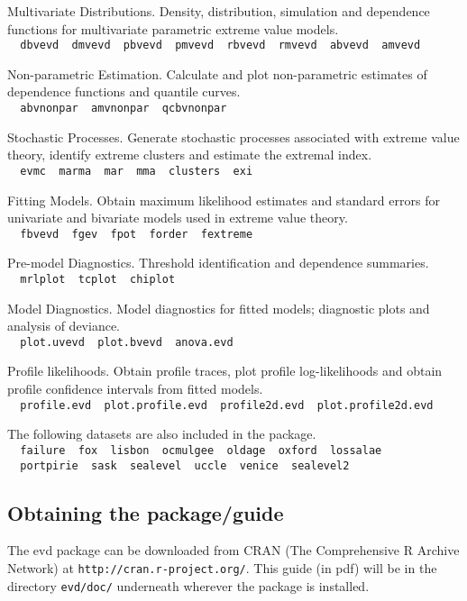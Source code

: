 \documentclass[11pt,a4paper]{article}
\begin{document}
Multivariate Distributions. Density, distribution, simulation and dependence functions for multivariate parametric extreme value models.\\
\verb+  dbvevd  dmvevd  pbvevd  pmvevd  rbvevd  rmvevd  abvevd  amvevd+

Non-parametric Estimation. Calculate and plot non-parametric estimates of dependence functions and quantile curves.\\  
\verb+  abvnonpar  amvnonpar  qcbvnonpar+

Stochastic Processes. Generate stochastic processes associated with extreme value theory, identify extreme clusters and estimate the extremal index.\\
\verb+  evmc  marma  mar  mma  clusters  exi+

Fitting Models. Obtain maximum likelihood estimates and standard errors for univariate and bivariate models used in extreme value theory.\\
\verb+  fbvevd  fgev  fpot  forder  fextreme+

Pre-model Diagnostics. Threshold identification and dependence summaries.\\
\verb+  mrlplot  tcplot  chiplot+ 

Model Diagnostics. Model diagnostics for fitted models; diagnostic plots and analysis of deviance.\\  
\verb+  plot.uvevd  plot.bvevd  anova.evd+

Profile likelihoods. Obtain profile traces, plot profile log-likelihoods and obtain profile confidence intervals from fitted models.\\ 
\verb+  profile.evd  plot.profile.evd  profile2d.evd  plot.profile2d.evd+

The following datasets are also included in the package.\\
\verb+  failure  fox  lisbon  ocmulgee  oldage  oxford  lossalae+\\ 
\verb+  portpirie  sask  sealevel  uccle  venice  sealevel2+

\subsection{Obtaining the package/guide}

The evd package can be downloaded from CRAN (The Comprehensive R
Archive Network) at \verb+http://cran.r-project.org/+. 
This guide (in pdf) will be in the directory \verb+evd/doc/+
underneath wherever the package is installed.
\end{document}
